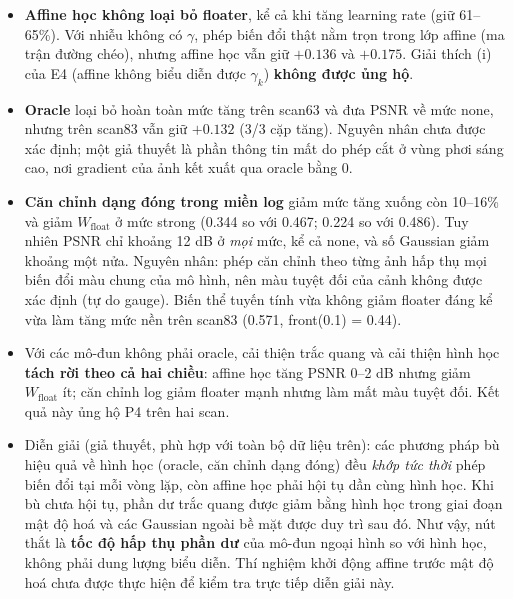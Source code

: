 \documentclass[11pt,a4paper]{article}
\begin{document}
\begin{itemize}
  \item \textbf{Affine học không loại bỏ floater}, kể cả khi tăng learning rate (giữ 61--65\%). Với nhiễu không có $\gamma$, phép biến đổi thật nằm trọn trong lớp affine (ma trận đường chéo), nhưng affine học vẫn giữ $+0.136$ và $+0.175$. Giải thích (i) của E4 (affine không biểu diễn được $\gamma_k$) \textbf{không được ủng hộ}.
  \item \textbf{Oracle} loại bỏ hoàn toàn mức tăng trên scan63 và đưa PSNR về mức none, nhưng trên scan83 vẫn giữ $+0.132$ (3/3 cặp tăng). Nguyên nhân chưa được xác định; một giả thuyết là phần thông tin mất do phép cắt ở vùng phơi sáng cao, nơi gradient của ảnh kết xuất qua oracle bằng 0.
  \item \textbf{Căn chỉnh dạng đóng trong miền log} giảm mức tăng xuống còn 10--16\% và giảm $W_{\text{float}}$ ở mức strong (0.344 so với 0.467; 0.224 so với 0.486). Tuy nhiên PSNR chỉ khoảng 12 dB ở \emph{mọi} mức, kể cả none, và số Gaussian giảm khoảng một nửa. Nguyên nhân: phép căn chỉnh theo từng ảnh hấp thụ mọi biến đổi màu chung của mô hình, nên màu tuyệt đối của cảnh không được xác định (tự do gauge). Biến thể tuyến tính vừa không giảm floater đáng kể vừa làm tăng mức nền trên scan83 (0.571, front(0.1) = 0.44).
  \item Với các mô-đun không phải oracle, cải thiện trắc quang và cải thiện hình học \textbf{tách rời theo cả hai chiều}: affine học tăng PSNR 0--2 dB nhưng giảm $W_{\text{float}}$ ít; căn chỉnh log giảm floater mạnh nhưng làm mất màu tuyệt đối. Kết quả này ủng hộ P4 trên hai scan.
  \item Diễn giải (giả thuyết, phù hợp với toàn bộ dữ liệu trên): các phương pháp bù hiệu quả về hình học (oracle, căn chỉnh dạng đóng) đều \emph{khớp tức thời} phép biến đổi tại mỗi vòng lặp, còn affine học phải hội tụ dần cùng hình học. Khi bù chưa hội tụ, phần dư trắc quang được giảm bằng hình học trong giai đoạn mật độ hoá và các Gaussian ngoài bề mặt được duy trì sau đó. Như vậy, nút thắt là \textbf{tốc độ hấp thụ phần dư} của mô-đun ngoại hình so với hình học, không phải dung lượng biểu diễn. Thí nghiệm khởi động affine trước mật độ hoá chưa được thực hiện để kiểm tra trực tiếp diễn giải này.
\end{itemize}
\end{document}
